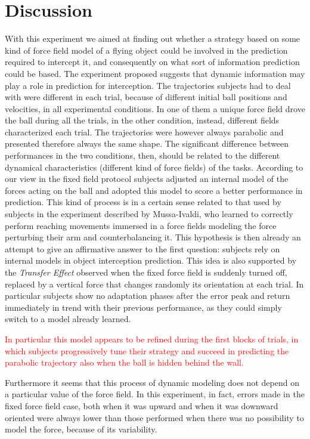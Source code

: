 \section{Discussion} \label{Discussion}

With this experiment we aimed at finding out whether a strategy based on some kind of force field model of a flying object could be involved in the prediction required to intercept it, and consequently on what sort of information prediction could be based.
The experiment proposed suggests that dynamic information may play a role in prediction for interception. The trajectories subjects had to deal with were different in each trial, because of different initial ball positions and velocities, in all experimental conditions. In one of them a unique force field drove the ball during all the trials, in the other condition, instead, different fields characterized each trial. The trajectories were however always parabolic and presented therefore always the same shape. The significant difference between performances in the two conditions, then, should be related to the different dynamical characteristics (different kind of force fields) of the tasks. According to our view in the fixed field protocol subjects adjusted an internal model of the forces acting on the ball and adopted this model to score a better performance in prediction.
This kind of process is in a certain sense related to that used by subjects in the experiment described by Mussa-Ivaldi, who learned to correctly perform reaching movements immersed in a force fields modeling the force perturbing their arm and counterbalancing it. This hypothesis is then already an attempt to give an affirmative answer to the first question: subjects rely on internal models in object interception prediction.
This idea is also supported by the \textit{Transfer Effect} observed when the fixed force field is suddenly turned off, replaced by a vertical force that changes randomly its orientation at each trial. In particular subjects show no adaptation phases after the error peak and return immediately in trend with their previous performance, as they could simply switch to a model already learned.

\textcolor{red}{In particular this model appears to be refined during the first blocks of trials, in which subjects progressively tune their strategy and succeed in predicting the parabolic trajectory also when the ball is hidden behind the wall.}

Furthermore it seems that this process of dynamic modeling does not depend on a particular value of the force field. In this experiment, in fact, errors made in the fixed force field case, both when it was upward and when it was downward oriented were always lower than those performed when there was no possibility to model the force, because of its variability. 


